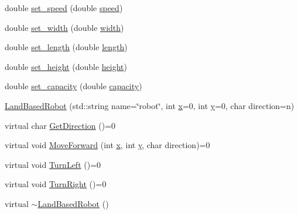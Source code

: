 \begin{DoxyCompactItemize}
double \hyperlink{classfp_1_1_land_based_robot_abddbc887170ed70d2c719cfdf9fed0b7}{set\+\_\+speed} (double \hyperlink{classfp_1_1_land_based_robot_a098908304491425d6264e59d9412e696}{speed})
\item 
double \hyperlink{classfp_1_1_land_based_robot_a04fccce1e72832a761b39889b8598c63}{set\+\_\+width} (double \hyperlink{classfp_1_1_land_based_robot_a4e49ce0ab6b8b0e4a998d5ce82303f8d}{width})
\item 
double \hyperlink{classfp_1_1_land_based_robot_a7dc263eed0275d71688a2e57fe93029a}{set\+\_\+length} (double \hyperlink{classfp_1_1_land_based_robot_aa96f1f19673132a99ce0b417faed83d3}{length})
\item 
double \hyperlink{classfp_1_1_land_based_robot_a2197cbdc219c952931fe05ad707ab9ed}{set\+\_\+height} (double \hyperlink{classfp_1_1_land_based_robot_a6b1ece64bf32bbe509042ccb80a2ab33}{height})
\item 
double \hyperlink{classfp_1_1_land_based_robot_a3db2d374deb78e67c19bdf07bca9d771}{set\+\_\+capacity} (double \hyperlink{classfp_1_1_land_based_robot_af906410bad105b30865b9a02fdd350f9}{capacity})
\item 
\hyperlink{classfp_1_1_land_based_robot_a08abaf52a0b6968a8dfce230a47adca7}{Land\+Based\+Robot} (std\+::string name=\char`\"{}robot\char`\"{}, int \hyperlink{classfp_1_1_land_based_robot_a305bb45b4478ab51080fa0d7fc7bc2d7}{x}=0, int \hyperlink{classfp_1_1_land_based_robot_ad1ff889538680eba6bc6eb135b4ccd63}{y}=0, char direction=\textquotesingle{}n\textquotesingle{})
\item 
virtual char \hyperlink{classfp_1_1_land_based_robot_a50841b6e40d4e92832770d26b427fea2}{Get\+Direction} ()=0
\item 
virtual void \hyperlink{classfp_1_1_land_based_robot_a370d28ef28553e8e7a56b1ea68884bb0}{Move\+Forward} (int \hyperlink{classfp_1_1_land_based_robot_a305bb45b4478ab51080fa0d7fc7bc2d7}{x}, int \hyperlink{classfp_1_1_land_based_robot_ad1ff889538680eba6bc6eb135b4ccd63}{y}, char direction)=0
\item 
virtual void \hyperlink{classfp_1_1_land_based_robot_acd135f01e40d4f2e32739156b56c722f}{Turn\+Left} ()=0
\item 
virtual void \hyperlink{classfp_1_1_land_based_robot_aa905ba0f9b2670bea138df1e5d6836ff}{Turn\+Right} ()=0
\item 
virtual \hyperlink{classfp_1_1_land_based_robot_acfe49650459e4e6c72b87e6eff1072d9}{$\sim$\+Land\+Based\+Robot} ()
\end{DoxyCompactItemize}
